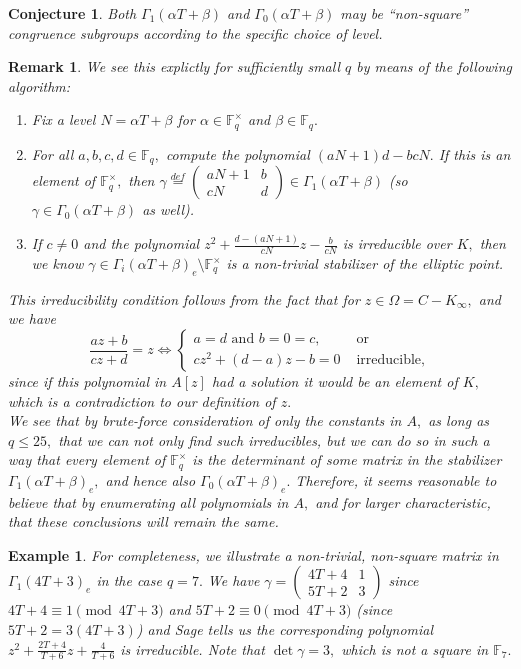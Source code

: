\documentclass[11pt]{amsart}
\newtheorem{conjecture}[theorem]{Conjecture}
\newtheorem{example}[theorem]{Example}
\newtheorem{remark}[theorem]{Remark}
\theoremstyle{definition}
\numberwithin{equation}{section}
\newcommand{\cN}{\mathcal{N}}		%
\newcommand{\bbF}{\mathbb{F}}		%
\begin{document}
\begin{conjecture}	
		Both $\Gamma_1(\alpha T+\beta)$ and $\Gamma_0(\alpha T+\beta)$ may be ``non-square'' congruence subgroups according to the specific choice of level.
\end{conjecture}
\begin{remark}
	We see this explictly for sufficiently small $q$ by means of the following algorithm:
	\begin{enumerate}
		\item Fix a level $N=\alpha T+\beta$ for $\alpha\in \bbF_q^{\times}$ and $\beta\in \bbF_q.$
		\item For all $a,b,c,d\in \bbF_q,$ compute the polynomial $(aN+1)d-bcN.$ If this is an element of $\bbF_q^{\times},$ then $\displaystyle{\gamma\overset{def}{=}\left(\begin{array}{cc} aN+1&b\\cN&d\end{array}\right)\in \Gamma_1(\alpha T+\beta)}$ (so $\gamma\in \Gamma_0(\alpha T+\beta)$ as well).
		\item If $c\neq 0$ and the polynomial $\displaystyle{z^2+\frac{d-(aN+1)}{cN}z-\frac{b}{cN}}$ is irreducible over $K,$ then we know $\gamma\in \Gamma_i(\alpha T+\beta)_e\setminus \bbF_q^{\times}$ is a non-trivial stabilizer of the elliptic point. 
	\end{enumerate}
	This irreducibility condition follows from the fact that for $z\in \Omega = C-K_{\infty},$ and we have 
	\[\frac{az+b}{cz+d}=z \iff \begin{cases}
	a=d \text{ and } b=0=c, &\text{ or }\\
	cz^2+(d-a)z-b=0 & \text{ irreducible,}
	\end{cases}\] since if this polynomial in $A[z]$ had a solution it would be an element of $K,$ which is a contradiction to our definition of $z.$\\
	
	We see that by brute-force consideration of only the constants in $A,$ as long as $q\leq 25,$ that we can not only find such irreducibles, but we can do so in such a way that every element of $\bbF_q^{\times}$ is the determinant of some matrix in the stabilizer $\Gamma_1(\alpha T+\beta)_e,$ and hence also $\Gamma_0(\alpha T+\beta)_e.$ Therefore, it seems reasonable to believe that by enumerating all polynomials in $A,$ and for larger characteristic, that these conclusions will remain the same.
\end{remark}
\begin{example}
	For completeness, we illustrate a non-trivial, non-square matrix in $\Gamma_1(4T+3)_e$ in the case $q=7.$ We have $\displaystyle{\gamma=\left(\begin{array}{cc}4T+4&1\\5T+2&3\end{array}\right)}$ since $4T+4\equiv 1\pmod{4T+3}$ and $5T+2\equiv 0\pmod{4T+3}$ (since $5T+2=3(4T+3)$) and Sage tells us the corresponding polynomial $\displaystyle{z^2+\frac{2T+4}{T+6}z+\frac{4}{T+6}}$ is irreducible. Note that $\det\gamma = 3,$ which is not a square in $\bbF_7.$
\end{example}
\end{document}

